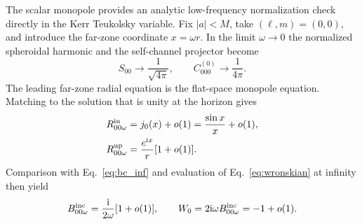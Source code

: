 \documentclass[aps,prd,twocolumn,10pt,nofootinbib,superscriptaddress,floatfix]{revtex4-2}
\newcommand{\ii}{\mathrm{i}}
\begin{document}
The scalar monopole provides an analytic low-frequency normalization check
directly in the Kerr Teukolsky variable.  Fix $|a|<M$, take
$(\ell,m)=(0,0)$, and introduce the far-zone coordinate $x=\omega r$.
In the limit $\omega\to0$ the normalized spheroidal harmonic and the
self-channel projector become
\begin{equation}
 S_{00}\longrightarrow\frac{1}{\sqrt{4\pi}},\qquad
 C^{(0)}_{000}\longrightarrow\frac{1}{4\pi}.
 \label{eq:l0-angular-limit}
\end{equation}
The leading far-zone radial equation is the flat-space monopole equation.
Matching to the solution that is unity at the horizon gives
\begin{align}
 R^{\rm in}_{00\omega}
 &=j_0(x)+o(1)=\frac{\sin x}{x}+o(1),\nonumber\\
 R^{\rm up}_{00\omega}
 &=\frac{e^{\ii x}}{r}[1+o(1)].
 \label{eq:l0-far-solutions}
\end{align}
Comparison with Eq.~\eqref{eq:bc_inf} and evaluation of
Eq.~\eqref{eq:wronskian} at infinity then yield
\begin{equation}
 B^{\rm inc}_{00\omega}=\frac{\ii}{2\omega}[1+o(1)],
 \qquad
 W_0=2\ii\omega B^{\rm inc}_{00\omega}=-1+o(1).
 \label{eq:l0-binc-wronskian}
\end{equation}
\end{document}
